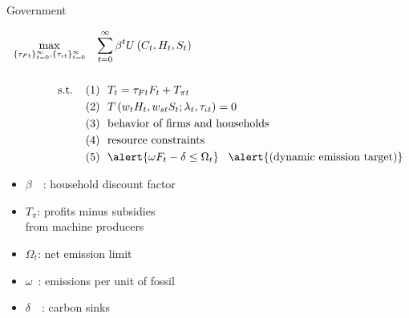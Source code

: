 \documentclass[11pt,aspectratio=169]{beamer}
\begin{document}
\addtocounter{framenumber}{-1}
\begin{frame}{ Government}
	\hypertarget{gov}{}
	\vspace{-4mm}
	\centering
	\begin{minipage}[t!]{1\textwidth}
		\begin{align*}
			\max_{\{\tau_{Ft}\}_{t=0}^{\infty}, \{\tau_{\iota t}\}_{t=0}^{\infty}}&\hspace{3mm} \sum_{t=0}^{\infty}\beta^t U\left(C_t,H_t, S_t\right)\\ \ \\
			\text{s.t.} \hspace{4mm}
			&{ (1)\ \ T_t={{\tau_{Ft}}}F_{t}}+T_{\pi t}\\
			&{(2)\ \ T\left(w_{t}H_{t},w_{st}S_{t}; \lambda_t, \tau_{\iota t}\right)=0}\\
			& {(3)\ \  \text{behavior of firms and households}}\\
			& {(4)\ \ \text{resource constraints} }\\
			&{(5)\ \  \alert{\omega F_t-\delta \leq\Omega_t }} \hspace{3mm} \alert{\text{(dynamic emission target)}}
		\end{align*}
	\end{minipage}
	
	\small
	\vspace{-4mm}
	\hspace{-10mm}
	\begin{minipage}[t!]{0.5\textwidth}
		\vspace{7mm}
		\begin{itemize}
			\item[] $\beta$\ \ : household discount factor\vspace{-2mm}
			\item[] $T_\pi$: profits minus subsidies \\ \hspace{5.5mm} from machine producers \vspace{0mm}
		\end{itemize}
	\end{minipage}
	\begin{minipage}[t!]{0.45\textwidth}
		\vspace{8mm}
		\begin{itemize}
			\item[] $\Omega_{t}$: net emission limit
			\vspace{-2mm}	
			\item[] $\omega$\ : emissions per unit of fossil \vspace{-0.8mm}
			\item[] $\delta$\ \ : carbon sinks \tiny{\citep{VanVuuren2018AlternativeTechnologies}}
		\end{itemize}
	\end{minipage}
	
\end{frame}
\end{document}
